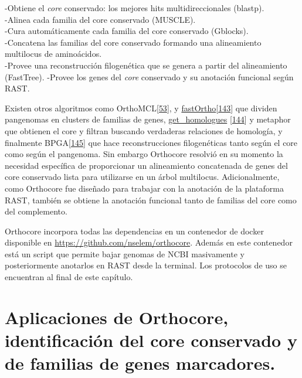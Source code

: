 \documentclass[12pt,twoside]{reedthesis}
\begin{document}
  -Obtiene el \emph{core} conservado: los mejores hits multidireccionales
  (blastp).\\
  -Alinea cada familia del core conservado (MUSCLE).\\
  -Cura automáticamente cada familia del core conservado (Gblocks).\\
  -Concatena las familias del core conservado formando una alineamiento
  multilocus de aminoácidos.\\
  -Provee una reconstrucción filogenética que se genera a partir del
  alineamiento (FastTree). -Provee los genes del \emph{core} conservado y
  su anotación funcional según RAST.
  
  Existen otros algoritmos como
  OrthoMCL{[}\protect\hyperlink{ref-li_orthomcl_2003}{53}{]}, y
  \href{https://github.com/grovesdixon/using_FastOrtho}{fastOrtho}{[}\protect\hyperlink{ref-wattam_patric_2014}{143}{]}
  que dividen pangenomas en clusters de familias de genes,
  \href{http://eead-csic-compbio.github.io/get_homologues/manual/}{get\_homologues}
  {[}\protect\hyperlink{ref-contreras-moreira_get_homologues_2013}{144}{]}
  y metaphor que obtienen el core y filtran buscando verdaderas relaciones
  de homología, y finalmente
  BPGA{[}\protect\hyperlink{ref-chaudhari_bpga-_2016}{145}{]} que hace
  reconstrucciones filogenéticas tanto según el core como según el
  pangenoma. Sin embargo Orthocore resolvió en su momento la necesidad
  específica de proporcionar un alineamiento concatenada de genes del core
  conservado lista para utilizarse en un árbol multilocus. Adicionalmente,
  como Orthocore fue diseñado para trabajar con la anotación de la
  plataforma RAST, también se obtiene la anotación funcional tanto de
  familias del core como del complemento.
  
  Orthocore incorpora todas las dependencias en un contenedor de docker
  disponible en \url{https://github.com/nselem/orthocore}. Además en este
  contenedor está un script que permite bajar genomas de NCBI masivamente
  y posteriormente anotarlos en RAST desde la terminal. Los protocolos de
  uso se encuentran al final de este capítulo.
  
  \section{Aplicaciones de Orthocore, identificación del core conservado y
  de familias de genes
  marcadores.}\label{aplicaciones-de-orthocore-identificacion-del-core-conservado-y-de-familias-de-genes-marcadores.}
  
\end{document}
